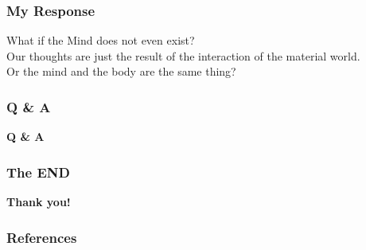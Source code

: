 \documentclass{beamer}
\begin{document}
\begin{frame}
    \frametitle{My Response}
    What if the Mind does not even exist? \\
    Our thoughts are just the result of the interaction of the material world. \\
    Or the mind and the body are the same thing?
\end{frame}

\begin{frame}
    \frametitle{Q \& A}
    {\Huge \textbf{Q \& A}}
\end{frame}

\begin{frame}
    \frametitle{The END}
    \centering
    {\Huge \textbf{Thank you!}}
\end{frame}

\begin{frame}
    \frametitle{References}
    \printbibliography
\end{frame}
\end{document}
